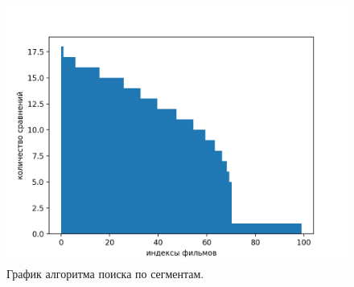 \documentclass[12pt]{report}
\begin{document}
		\begin{figure}[H]
		\centering
		\includegraphics[scale=0.9]{seg_sorted.png}
		\caption{График алгоритма поиска по сегментам.}
		\label{fig:seg_sc_sorted}
	\end{figure}
\end{document}
